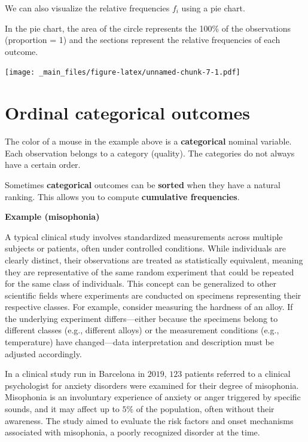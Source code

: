 \documentclass[
]{book}
\begin{document}
We can also visualize the relative frequencies \(f_i\) using a pie chart.

In the pie chart, the area of the circle represents the 100\% of the observations (proportion = 1) and the sections represent the relative frequencies of each outcome.

\texttt{[image: \_main\_files/figure-latex/unnamed-chunk-7-1.pdf]}

\hypertarget{ordinal-categorical-outcomes}{%
\section{Ordinal categorical outcomes}\label{ordinal-categorical-outcomes}}

The color of a mouse in the example above is a \textbf{categorical} nominal variable. Each observation belongs to a category (quality). The categories do not always have a certain order.

Sometimes \textbf{categorical} outcomes can be \textbf{sorted} when they have a natural ranking. This allows you to compute \textbf{cumulative frequencies}.

\textbf{Example (misophonia)}

A typical clinical study involves standardized measurements across multiple subjects or patients, often under controlled conditions. While individuals are clearly distinct, their observations are treated as statistically equivalent, meaning they are representative of the same random experiment that could be repeated for the same class of individuals. This concept can be generalized to other scientific fields where experiments are conducted on specimens representing their respective classes. For example, consider measuring the hardness of an alloy. If the underlying experiment differs---either because the specimens belong to different classes (e.g., different alloys) or the measurement conditions (e.g., temperature) have changed---data interpretation and description must be adjusted accordingly.

In a clinical study run in Barcelona in \(2019\), \(123\) patients referred to a clinical psychologist for anxiety disorders were examined for their degree of misophonia. Misophonia is an involuntary experience of anxiety or anger triggered by specific sounds, and it may affect up to \(5\%\) of the population, often without their awareness. The study aimed to evaluate the risk factors and onset mechanisms associated with misophonia, a poorly recognized disorder at the time.
\end{document}
